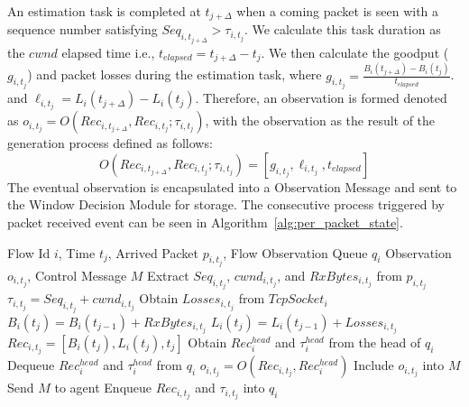 \documentclass[journal]{IEEEtran}
\begin{document}
An estimation task is completed at $t_{j+\Delta}$ when a coming packet is seen with a sequence number satisfying $Seq_{i,t_{j+\Delta}} > \tau_{i,t_j}$.
We calculate this task duration as the $cwnd$ elapsed time i.e., $t_{elapsed} = t_{j+\Delta} - t_{j}$. We then calculate the goodput ($g_{i, t_j}$) and packet losses during the estimation task, where $g_{i, t_j} = \frac{B_i(t_{j+\Delta})-B_i(t_j)}{t_{elapsed}}$. and $\ell_{i,t_j} = L_i(t_{j+\Delta})-L_i(t_j)$. Therefore, an observation is formed denoted as 
$o_{i,t_j}=O(Rec_{i,t_{j+\Delta}},Rec_{i,t_{j}};\tau_{i,t_j})$, with the observation as the result of the generation process defined as follows:
$$ O(Rec_{i,t_{j+\Delta}},Rec_{i,t_{j}};\tau_{i,t_j}) = \left[g_{i, t_j}, \ell_{i,t_j}, t_{elapsed}\right]$$
The eventual observation is encapsulated into a Observation Message and sent to the Window Decision Module for storage. The consecutive process triggered by packet received event can be seen in Algorithm~\ref{alg:per_packet_state}.

\begin{algorithm}[t]
\renewcommand{\algorithmicrequire}{\textbf{Input:}}
\renewcommand{\algorithmicensure}{\textbf{Output:}}
\caption{Receiver Measurement and Observation Generation}
\label{alg:per_packet_state}
\begin{algorithmic}[1]
\Require Flow Id $i$, Time $t_j$, Arrived Packet $p_{i,t_j}$, Flow Observation Queue $q_i$
\Ensure Observation $o_{i,t_j}$, Control Message $M$
\State Extract $Seq_{i,t_j}$, $cwnd_{i,t_j}$, and $RxBytes_{i,t_j}$ from $p_{i,t_j}$
\State $\tau_{i,t_j} = Seq_{i,t_j}+cwnd_{i,t_j}$
\State Obtain $Losses_{i,t_j}$ from $TcpSocket_i$
\State $B_i(t_j) = B_i(t_{j-1})+ Rx Bytes_{i, t_j}$
\State $L_i(t_j) = L_i(t_{j-1}) + Losses_{i,t_j}$
\State $Rec_{i,t_j}=\left[B_i(t_j), L_i(t_j), t_j\right]$
\State Obtain $Rec_{i}^{head}$ and $\tau_{i}^{head}$ from the head of $q_i$
  \State Dequeue $Rec_{i}^{head}$ and $\tau_{i}^{head}$ from $q_i$
  \State $o_{i,t_{j}} = O(Rec_{i,t_j},Rec_{i}^{head})$
  \State Include $o_{i,t_{j}}$ into $M$
  \State Send $M$ to agent
  \State Enqueue $Rec_{i,t_j}$ and $\tau_{i,t_j}$ into $q_i$
\EndIf
\end{algorithmic}
\end{algorithm}
\end{document}
